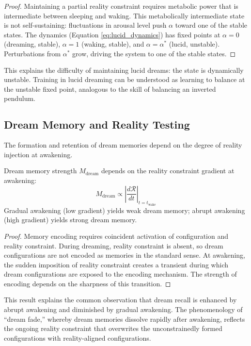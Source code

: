 \begin{proof}
Maintaining a partial reality constraint requires metabolic power that is intermediate between sleeping and waking. This metabolically intermediate state is not self-sustaining: fluctuations in arousal level push $\alpha$ toward one of the stable states. The dynamics (Equation \ref{eq:lucid_dynamics}) has fixed points at $\alpha = 0$ (dreaming, stable), $\alpha = 1$ (waking, stable), and $\alpha = \alpha^*$ (lucid, unstable). Perturbations from $\alpha^*$ grow, driving the system to one of the stable states.
\end{proof}

This explains the difficulty of maintaining lucid dreams: the state is dynamically unstable. Training in lucid dreaming can be understood as learning to balance at the unstable fixed point, analogous to the skill of balancing an inverted pendulum.

\subsection{Dream Memory and Reality Testing}

The formation and retention of dream memories depend on the degree of reality injection at awakening.

\begin{theorem}
\label{thm:dream_memory}
Dream memory strength $M_{\text{dream}}$ depends on the reality constraint gradient at awakening:
\begin{equation}
M_{\text{dream}} \propto \left| \frac{d\mathcal{R}}{dt} \right|_{t = t_{\text{wake}}}
\label{eq:dream_memory}
\end{equation}
Gradual awakening (low gradient) yields weak dream memory; abrupt awakening (high gradient) yields strong dream memory.
\end{theorem}

\begin{proof}
Memory encoding requires coincident activation of configuration and reality constraint. During dreaming, reality constraint is absent, so dream configurations are not encoded as memories in the standard sense. At awakening, the sudden imposition of reality constraint creates a transient during which dream configurations are exposed to the encoding mechanism. The strength of encoding depends on the sharpness of this transition.
\end{proof}

This result explains the common observation that dream recall is enhanced by abrupt awakening and diminished by gradual awakening. The phenomenology of ``dream fade,'' whereby dream memories dissolve rapidly after awakening, reflects the ongoing reality constraint that overwrites the unconstrainedly formed configurations with reality-aligned configurations.

